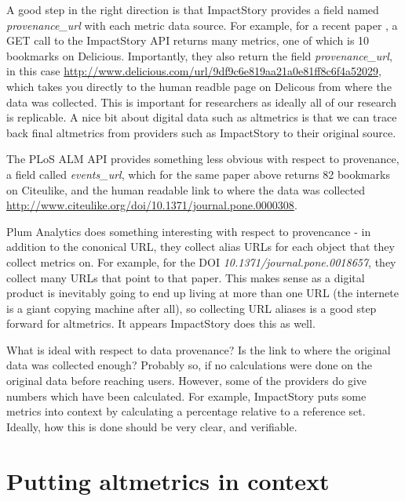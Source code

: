 \documentclass[letterpaper,superscriptaddress,showkeys,longbibliography]{revtex4-1}\usepackage{graphicx, color}
\begin{document}
A good step in the right direction is that ImpactStory provides a field named \emph{provenance\_url} with each metric data source. For example, for a recent paper \cite{piwowar2007}, a GET call to the ImpactStory API returns many metrics, one of which is 10 bookmarks on Delicious. Importantly, they also return the field \emph{provenance\_url}, in this case \url{http://www.delicious.com/url/9df9c6e819aa21a0e81ff8c6f4a52029}, which takes you directly to the human readble page on Delicous from where the data was collected. This is important for researchers as ideally all of our research is replicable. A nice bit about digital data such as altmetrics is that we can trace back final altmetrics from providers such as ImpactStory to their original source.

The PLoS ALM API provides something less obvious with respect to provenance, a field called \emph{events\_url}, which for the same paper above \cite{piwowar2007} returns 82 bookmarks on Citeulike, and the human readable link to where the data was collected \url{http://www.citeulike.org/doi/10.1371/journal.pone.0000308}. 

Plum Analytics does something interesting with respect to provencance - in addition to the cononical URL, they collect alias URLs for each object that they collect metrics on. For example, for the DOI \emph{10.1371/journal.pone.0018657}, they collect many URLs that point to that paper. This makes sense as a digital product is inevitably going to end up living at more than one URL (the internete is a giant copying machine after all), so collecting URL aliases is a good step forward for altmetrics. It appears ImpactStory does this as well.

What is ideal with respect to data provenance? Is the link to where the original data was collected enough? Probably so, if no calculations were done on the original data before reaching users. However, some of the providers do give numbers which have been calculated. For example, ImpactStory puts some metrics into context by calculating a percentage relative to a reference set. Ideally, how this is done should be very clear, and verifiable. 

\section*{Putting altmetrics in context}
\end{document}
